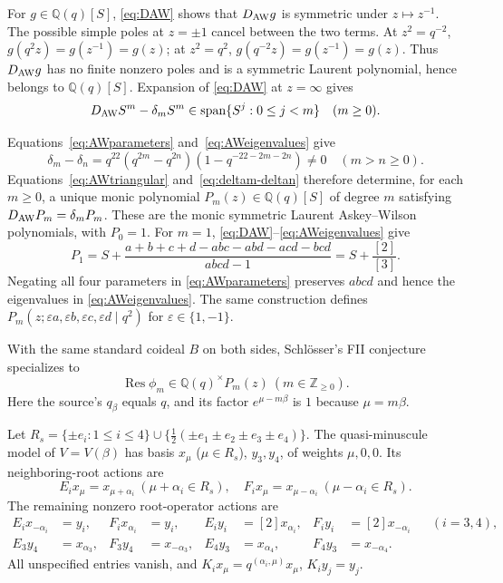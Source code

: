\documentclass[12pt,reqno]{amsart}
\theoremstyle{plain}
\theoremstyle{definition}
\numberwithin{equation}{section}
\newcommand{\kk}{\mathbb Q(q)}
\newcommand{\Res}{\operatorname{Res}}
\newcommand{\Span}{\operatorname{span}}
\begin{document}
For $g\in\kk[S]$, \eqref{eq:DAW} shows that $D_{\rm AW}g$
is symmetric under $z\mapsto z^{-1}$.
The possible simple poles at $z=\pm1$ cancel between the two terms.
At $z^2=q^{-2}$, $g(q^2z)=g(z^{-1})=g(z)$; at $z^2=q^2$,
$g(q^{-2}z)=g(z^{-1})=g(z)$.
Thus $D_{\rm AW}g$ has no finite nonzero poles and is a
symmetric Laurent polynomial, hence belongs to $\kk[S]$.
Expansion of \eqref{eq:DAW} at $z=\infty$ gives
\begin{equation}\label{eq:AWtriangular}
	D_{\rm AW}S^m-\delta_mS^m
	\in\Span\{S^j:0\le j<m\}
	\quad(m\ge0).
\end{equation}

Equations~\eqref{eq:AWparameters} and~\eqref{eq:AWeigenvalues}
give
\begin{equation}\label{eq:deltam-deltan}
	\delta_m-\delta_n
	=q^{22}(q^{2m}-q^{2n})(1-q^{-22-2m-2n})\ne0
	\quad(m>n\ge0).
\end{equation}
Equations~\eqref{eq:AWtriangular} and~\eqref{eq:deltam-deltan}
therefore determine, for each $m\ge0$, a unique monic polynomial
$P_m(z)\in\kk[S]$ of degree $m$ satisfying
$D_{\rm AW}P_m=\delta_mP_m$.
These are the monic symmetric Laurent Askey--Wilson polynomials,
with $P_0=1$. For $m=1$,
\eqref{eq:DAW}--\eqref{eq:AWeigenvalues} give
\begin{equation}\label{eq:firstAW}
	P_1=S+\frac{a+b+c+d-abc-abd-acd-bcd}{abcd-1}
	=S+\frac{[2]}{[3]}.
\end{equation}
Negating all four parameters in \eqref{eq:AWparameters}
preserves $abcd$ and hence the eigenvalues in
\eqref{eq:AWeigenvalues}.
The same construction defines
$P_m(z;\varepsilon a,\varepsilon b,\varepsilon c,\varepsilon d\mid q^2)$
for $\varepsilon\in\{1,-1\}$.

With the same standard coideal $B$ on both sides,
Schl\"osser's FII conjecture
\cite[Lemma~6.3 and Conjecture~6.4]{Sch26} specializes to
\begin{equation}\label{eq:Schconjecture}
 \Res\phi_m\in\kk^\times P_m(z)
 \ (m\in\mathbb Z_{\ge0}).
\end{equation}
Here the source's $q_\beta$ equals $q$, and its factor
$e^{\mu-m\beta}$ is $1$ because $\mu=m\beta$.


Let $R_s=\{\pm e_i:1\leq i\leq4\}
\cup\{\tfrac12(\pm e_1\pm e_2\pm e_3\pm e_4)\}$.
The quasi-minuscule model of $V=V(\beta)$ has basis
$x_\mu$ ($\mu\in R_s$), $y_3,y_4$, of weights $\mu,0,0$.
Its neighboring-root actions are
\[
E_ix_\mu=x_{\mu+\alpha_i}\ (\mu+\alpha_i\in R_s),\quad
F_ix_\mu=x_{\mu-\alpha_i}\ (\mu-\alpha_i\in R_s).
\]
The remaining nonzero root-operator actions are
\begin{align}
	E_ix_{-\alpha_i}&=y_i,&
	F_ix_{\alpha_i}&=y_i,&
	E_iy_i&=[2]x_{\alpha_i},&
	F_iy_i&=[2]x_{-\alpha_i}
	&&(i=3,4),\label{eq:zerostrings}\\
	E_3y_4&=x_{\alpha_3},&
	F_3y_4&=x_{-\alpha_3},&
	E_4y_3&=x_{\alpha_4},&
	F_4y_3&=x_{-\alpha_4}.
	\label{eq:crosszero}
\end{align}
All unspecified entries vanish, and $K_ix_\mu=q^{(\alpha_i,\mu)}x_\mu$, $K_iy_j=y_j$.
\end{document}
